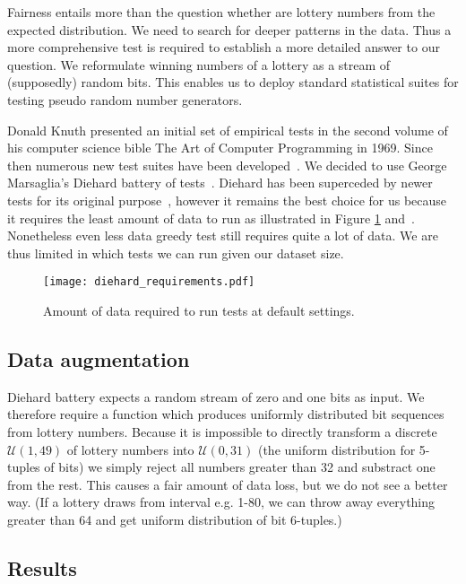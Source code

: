 Fairness entails more than the question whether are lottery numbers from the expected distribution. We need to search for deeper patterns in the data.
Thus a more comprehensive test is required to establish a more detailed answer to our question. We reformulate winning numbers
of a lottery as a stream of (supposedly) random bits. This enables us to deploy standard statistical suites for testing pseudo random number
generators.

Donald Knuth presented an initial set of empirical tests in the second volume of his computer science bible The Art of Computer Programming in 1969.
Since then numerous new test suites have been developed~\cite{HAC,NISTBible,dieharder,testu01}. We decided to use George Marsaglia's
Diehard battery of tests~\cite{diehard}. Diehard has been superceded by newer tests for its original purpose~\cite{dieharder}, however
it remains the best choice for us because it requires the least amount of data to run as illustrated in Figure \ref{fig:requirements}
and~\cite{datasize-dieharder}. Nonetheless even less data greedy test still requires quite a lot of data.
We are thus limited in which tests we can run given our dataset size.
\begin{figure}
    \centering
    \texttt{[image: diehard\_requirements.pdf]}
    \caption{Amount of data required to run tests at default settings.}
    \label{fig:requirements}
\end{figure}

\subsection{Data augmentation}

Diehard battery expects a random stream of zero and one bits as input. We therefore require a function which produces uniformly
distributed bit sequences from lottery numbers. Because it is impossible to directly transform a discrete $\mathcal{U}(1, 49)$
of lottery numbers into $\mathcal{U}(0, 31)$ (the uniform distribution for 5-tuples of bits) we simply reject all numbers greater
than 32 and substract one from the rest. This causes a fair amount of data loss, but we do not see a better way.
(If a lottery draws from interval e.g. 1-80, we can throw away everything greater than 64 and get uniform distribution of bit 6-tuples.)

\subsection{Results}

